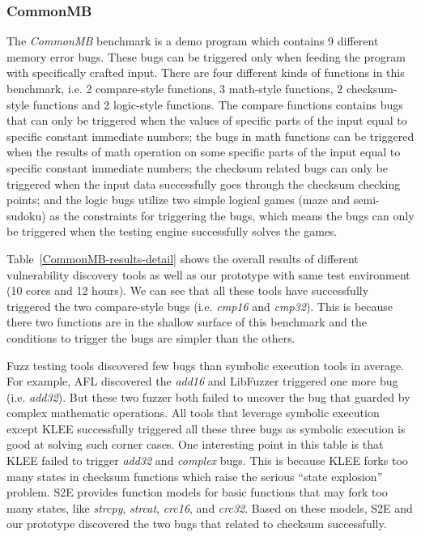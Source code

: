 \subsubsection{CommonMB}
\noindent The \emph{CommonMB} benchmark is a demo program which contains 9 different memory error bugs. These bugs can be triggered only when feeding the program with specifically crafted input. There are four different kinds of functions in this benchmark, i.e. 2 compare-style functions, 3 math-style functions, 2 checksum-style functions and 2 logic-style functions. The compare functions contains bugs that can only be triggered when the values of specific parts of the input equal to specific constant immediate numbers; the bugs in math functions can be triggered when the results of math operation on some specific parts of the input equal to specific constant immediate numbers; the checksum related bugs can only be triggered when the input data successfully goes through the checksum checking points; and the logic bugs utilize two simple logical games (maze and semi-sudoku) as the constraints for triggering the bugs, which means the bugs can only be triggered when the testing engine successfully solves the games.

Table~\ref{CommonMB-results-detail} shows the overall results of different vulnerability discovery tools as well as our prototype with same test environment (10 cores and 12 hours).
We can see that all these tools have successfully triggered the two compare-style bugs (i.e. \textit{cmp16} and \textit{cmp32}). This is because there two functions are in the shallow surface of this benchmark and the conditions to trigger the bugs are simpler than the others.  

Fuzz testing tools discovered few bugs than symbolic execution tools in average. For example, AFL discovered the \textit{add16} and LibFuzzer triggered one more bug (i.e. \textit{add32}). But these two fuzzer both failed to uncover the bug that guarded by complex mathematic operations. All tools that leverage symbolic execution except KLEE successfully triggered all these three bugs as symbolic execution is good at solving such corner cases. One interesting point in this table is that KLEE failed to trigger \textit{add32} and \textit{complex} bugs. This is because KLEE forks too many states in checksum functions which raise the serious ``state explosion'' problem. 
S2E provides function models for basic functions that may fork too many states, like \textit{strcpy}, \textit{strcat}, \textit{crc16}, and \textit{crc32}. Based on these models, S2E and our prototype discovered the two bugs that related to checksum successfully. 


